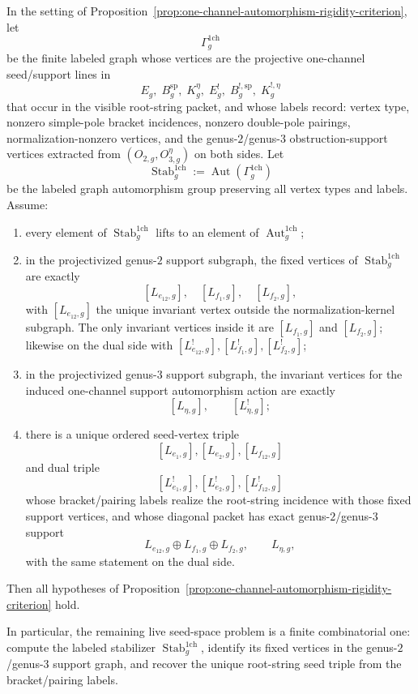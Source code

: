 \begin{proposition}\label{prop:one-channel-support-graph-stabilizer-criterion}
In the setting of
Proposition~\textup{\ref{prop:one-channel-automorphism-rigidity-criterion}},
let
\[
\Gamma_g^{\mathrm{1ch}}
\]
be the finite labeled graph whose vertices are the projective
one-channel seed/support lines in
\[
E_g,\; B_g^{\mathrm{sp}},\; K_g^\eta,\;
E_g^!,\; B_g^{!,\mathrm{sp}},\; K_g^{!,\eta}
\]
that occur in the visible root-string packet, and whose labels record:
vertex type, nonzero simple-pole bracket incidences, nonzero
double-pole pairings, normalization-nonzero vertices, and the
genus-$2$/genus-$3$ obstruction-support vertices extracted from
$(O_{2,g},O_{3,g}^\eta)$ on both sides.  Let
\[
\operatorname{Stab}_g^{\mathrm{1ch}}
:=
\operatorname{Aut}(\Gamma_g^{\mathrm{1ch}})
\]
be the labeled graph automorphism group preserving all vertex types and
labels.  Assume:
\begin{enumerate}[label=\textup{(\roman*)}]
\item every element of $\operatorname{Stab}_g^{\mathrm{1ch}}$ lifts to
  an element of $\operatorname{Aut}_g^{\mathrm{1ch}}$;
\item in the projectivized genus-$2$ support subgraph, the fixed
  vertices of $\operatorname{Stab}_g^{\mathrm{1ch}}$ are exactly
  \[
  [L_{e_{12},g}],\quad [L_{f_1,g}],\quad [L_{f_2,g}],
  \]
  with $[L_{e_{12},g}]$ the unique invariant vertex outside the
  normalization-kernel subgraph.
  The only invariant vertices inside it are
  $[L_{f_1,g}]$ and $[L_{f_2,g}]$; likewise on the dual side with
  $[L_{e_{12},g}^!], [L_{f_1,g}^!], [L_{f_2,g}^!]$;
\item in the projectivized genus-$3$ support subgraph, the invariant
  vertices for the induced one-channel support automorphism action are
  exactly
  \[
  [L_{\eta,g}],\qquad [L_{\eta,g}^!];
  \]
\item there is a unique ordered seed-vertex triple
  \[
  [L_{e_1,g}], [L_{e_2,g}], [L_{f_{12},g}]
  \]
  and dual triple
  \[
  [L_{e_1,g}^!], [L_{e_2,g}^!], [L_{f_{12},g}^!]
  \]
  whose bracket/pairing labels realize the root-string incidence with
  those fixed support vertices, and whose diagonal packet has exact
  genus-$2$/genus-$3$ support
  \[
  L_{e_{12},g}\oplus L_{f_1,g}\oplus L_{f_2,g},
  \qquad
  L_{\eta,g},
  \]
  with the same statement on the dual side.
\end{enumerate}
Then all hypotheses of
Proposition~\ref{prop:one-channel-automorphism-rigidity-criterion}
hold.

In particular, the remaining live seed-space problem is a finite
combinatorial one: compute the labeled stabilizer
$\operatorname{Stab}_g^{\mathrm{1ch}}$, identify its fixed vertices in
the genus-$2$/genus-$3$ support graph, and recover the unique
root-string seed triple from the bracket/pairing labels.
\end{proposition}

